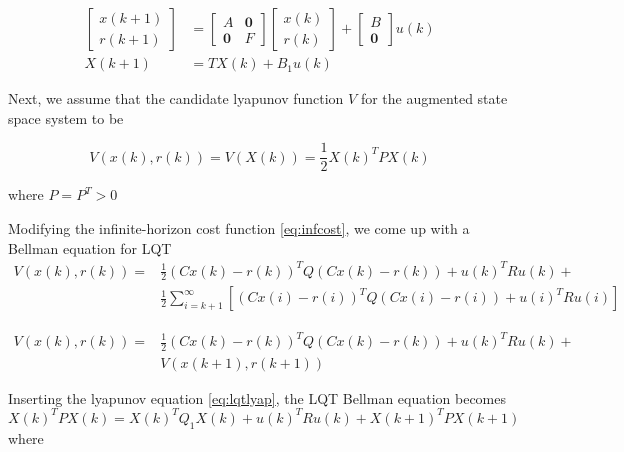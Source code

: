 \begin{equation}
\begin{split}
\left[ \begin{array}{c}
x(k+1) \\ 
r(k+1)
\end{array} \right] &= \left[\begin{array}{cc}
A & \textbf{0} \\ 
\textbf{0} & F
\end{array}  \right] \left[ \begin{array}{c}
x(k) \\ 
r(k)
\end{array} \right] + \left[ \begin{array}{c}
B \\ 
\textbf{0}
\end{array} \right] u(k) \\
X(k+1) &= TX(k) + B_1u(k)
\end{split}
\end{equation}

Next, we assume that the candidate lyapunov function $V$ for the augmented state space system to be

\begin{equation}
\label{eq:lqtlyap}
V(x(k), r(k)) = V(X(k)) = \frac{1}{2}X(k)^TPX(k)
\end{equation}

where $ P = P^T > 0 $

Modifying the infinite-horizon cost function \eqref{eq:infcost}, we come up with a Bellman equation for LQT
\begin{equation}
\begin{split}
V(x(k), r(k)) = &\frac{1}{2} (Cx(k)-r(k))^TQ(Cx(k)-r(k)) + u(k)^TRu(k) + \\
&\frac{1}{2} \sum_{i=k+1}^{\infty} \left[ (Cx(i)-r(i))^TQ(Cx(i)-r(i)) + u(i)^TRu(i)\right] 
\end{split}
\end{equation}

\begin{equation}
\begin{split}
V(x(k), r(k)) = &\frac{1}{2} (Cx(k)-r(k))^TQ(Cx(k)-r(k)) + u(k)^TRu(k) + \\
& V(x(k+1), r(k+1))
\end{split}
\end{equation}

Inserting the lyapunov equation \eqref{eq:lqtlyap}, the LQT Bellman equation becomes
\begin{equation}
\label{eq:lqtbellman}
X(k)^TPX(k) =  X(k)^TQ_1X(k) + u(k)^TRu(k) + X(k+1)^TPX(k+1)
\end{equation}
where

